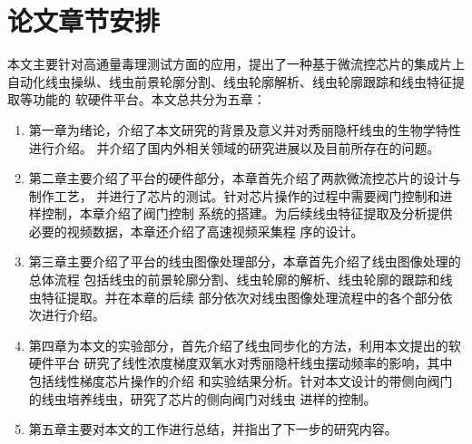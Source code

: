 \section{论文章节安排}
	本文主要针对高通量毒理测试方面的应用，提出了一种基于微流控芯片的集成片上
	自动化线虫操纵、线虫前景轮廓分割、线虫轮廓解析、线虫轮廓跟踪和线虫特征提取等功能的
	软硬件平台。本文总共分为五章：
	\begin{enumerate}
	  \item 第一章为绪论，介绍了本文研究的背景及意义并对秀丽隐杆线虫的生物学特性进行介绍。
	  并介绍了国内外相关领域的研究进展以及目前所存在的问题。
	  \item 第二章主要介绍了平台的硬件部分，本章首先介绍了两款微流控芯片的设计与制作工艺，
	  并进行了芯片的测试。针对芯片操作的过程中需要阀门控制和进样控制，本章介绍了阀门控制
	  系统的搭建。为后续线虫特征提取及分析提供必要的视频数据，本章还介绍了高速视频采集程
	  序的设计。
	  \item 第三章主要介绍了平台的线虫图像处理部分，本章首先介绍了线虫图像处理的总体流程
	  包括线虫的前景轮廓分割、线虫轮廓的解析、线虫轮廓的跟踪和线虫特征提取。并在本章的后续
	  部分依次对线虫图像处理流程中的各个部分依次进行介绍。
	  \item 第四章为本文的实验部分，首先介绍了线虫同步化的方法，利用本文提出的软硬件平台
	  研究了线性浓度梯度双氧水对秀丽隐杆线虫摆动频率的影响，其中包括线性梯度芯片操作的介绍
	  和实验结果分析。针对本文设计的带侧向阀门的线虫培养线虫，研究了芯片的侧向阀门对线虫
	  进样的控制。
	  \item 第五章主要对本文的工作进行总结，并指出了下一步的研究内容。
	\end{enumerate}
\label{sec:intro:org}










